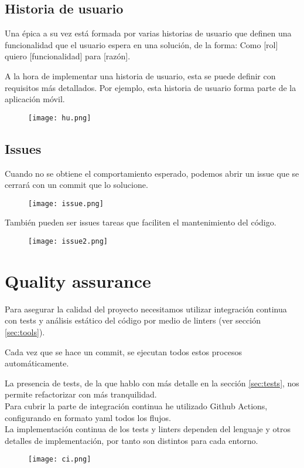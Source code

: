 \subsection{Historia de usuario}
Una épica a su vez está formada por varias historias de usuario que definen una funcionalidad que el usuario espera en una solución, de la forma: Como [rol] quiero [funcionalidad] para [razón].

A la hora de implementar una historia de usuario, esta se puede definir con requisitos más detallados.
Por ejemplo, esta historia de usuario forma parte de la aplicación móvil.

\begin{figure}[H]
	\centering	
	\texttt{[image: hu.png]}
	\end{figure}

\subsection{Issues}
Cuando no se obtiene el comportamiento esperado, podemos abrir un issue que se cerrará con un commit que lo solucione.

\begin{figure}[H]
	\centering	
	\texttt{[image: issue.png]}
	\end{figure}

	También pueden ser issues tareas que faciliten el mantenimiento del código.

\begin{figure}[H]
	\centering	
	\texttt{[image: issue2.png]}
	\end{figure}


\section{Quality assurance}

Para asegurar la calidad del proyecto necesitamos utilizar integración continua con tests y análisis estático del código por medio de linters (ver sección \ref{sec:tools}).

Cada vez que se hace un commit, se ejecutan todos estos procesos automáticamente.

La presencia de tests, de la que hablo con más detalle en la sección \ref{sec:tests}, nos permite refactorizar con más 
tranquilidad. \\

Para cubrir la parte de integración continua he utilizado Github Actions,  configurando en formato yaml todos los flujos.\\
La implementación continua de los tests y linters dependen del lenguaje y otros detalles de implementación, por tanto
son distintos para cada entorno.
\begin{figure}[H]
	\centering	
	\texttt{[image: ci.png]}
	\end{figure}

